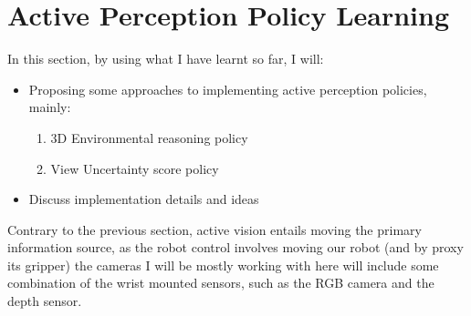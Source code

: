 \chapter{Active Perception Policy Learning}\label{ch:appl}
In this section, by using what I have learnt so far, I will:
  \begin{itemize}
    \item Proposing some approaches to implementing active perception policies, mainly:
      \begin{enumerate}
        \item 3D Environmental reasoning policy
        \item View Uncertainty score policy
      \end{enumerate}
    \item Discuss implementation details and ideas
  \end{itemize}

Contrary to the previous section, active vision entails moving the primary information source, as the robot control involves moving our robot (and by proxy its gripper) the cameras I will be mostly working with here will include some combination of the wrist mounted sensors, such as the RGB camera and the depth sensor.



% 
  